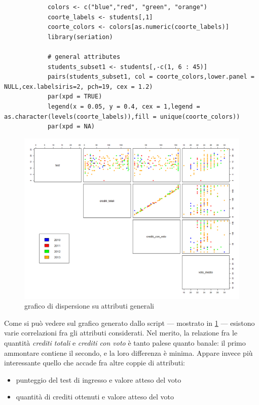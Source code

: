             \begin{lstlisting}
            colors <- c("blue","red", "green", "orange")
            coorte_labels <- students[,1]
            coorte_colors <- colors[as.numeric(coorte_labels)]
            library(seriation)
            
            # general attributes
            students_subset1 <- students[,-c(1, 6 : 45)]
            pairs(students_subset1, col = coorte_colors,lower.panel = 	NULL,cex.labelsiris=2, pch=19, cex = 1.2)
            par(xpd = TRUE)
            legend(x = 0.05, y = 0.4, cex = 1,legend = 	as.character(levels(coorte_labels)),fill = unique(coorte_colors))
            par(xpd = NA)
            \end{lstlisting}

            \begin{figure}
                \centering
                \caption{grafico di dispersione su attributi generali}
                \label{fig1}
            	\includegraphics[scale=0.32]{img/scatter_plot_1_gen.png}
            \end{figure}

            Come si può vedere sul grafico generato dallo script --- mostrato in \ref{fig1} --- esistono varie correlazioni fra gli attributi considerati. Nel merito, la relazione fra le quantità \textit{crediti totali} e \textit{crediti con voto} è tanto palese quanto banale: il primo ammontare contiene il secondo, e la loro differenza è minima. Appare invece più interessante quello che accade fra altre coppie di attributi:

            \begin{itemize}
                \item punteggio del test di ingresso e valore atteso del voto 
                \item quantità di crediti ottenuti e valore atteso del voto
            \end{itemize}

